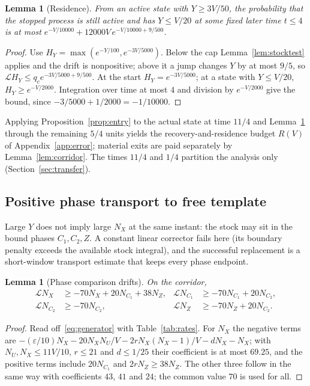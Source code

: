 \documentclass[11pt,a4paper]{article}
\theoremstyle{plain}
\newtheorem{lemma}[theorem]{Lemma}
\theoremstyle{definition}
\theoremstyle{remark}
\newcommand{\eps}{\varepsilon}
\newcommand{\Lgen}{\mathcal L}
\begin{document}
\begin{lemma}[Residence]\label{lem:residence}
From an active state with $Y\ge3V/50$, the probability that the stopped process is still active and has $Y\le V/20$ at some fixed later time $t\le4$ is at most $e^{-V/10000}+12000V\,e^{-V/10000+9/500}$.
\end{lemma}
\begin{proof}
Use $H_Y=\max(e^{-Y/100},e^{-3V/5000})$. Below the cap Lemma~\ref{lem:stocktest} applies and the drift is nonpositive; above it a jump changes $Y$ by at most $9/5$, so $\Lgen H_Y\le q_ce^{-3V/5000+9/500}$. At the start $H_Y=e^{-3V/5000}$; at a state with $Y\le V/20$, $H_Y\ge e^{-V/2000}$. Integration over time at most $4$ and division by $e^{-V/2000}$ give the bound, since $-3/5000+1/2000=-1/10000$.
\end{proof}
Applying Proposition~\ref{prop:entry} to the actual state at time $11/4$ and Lemma~\ref{lem:residence} through the remaining $5/4$ units yields the recovery-and-residence budget $R(V)$ of Appendix~\ref{app:error}; material exits are paid separately by Lemma~\ref{lem:corridor}. The times $11/4$ and $1/4$ partition the analysis only (Section~\ref{sec:transfer}).

\subsection{Positive phase transport to free template}\label{sec:phase}
Large $Y$ does not imply large $N_X$ at the same instant: the stock may sit in the bound phases $C_1,C_2,Z$. A constant linear corrector fails here (its boundary penalty exceeds the available stock integral), and the successful replacement is a short-window transport estimate that keeps every phase endpoint.

\begin{lemma}[Phase comparison drifts]\label{lem:phase}
On the corridor,
\begin{equation}\label{eq:phase-drift}
\begin{aligned}
\Lgen N_X&\ge-70N_X+20N_{C_1}+38N_Z,&
\Lgen N_{C_1}&\ge-70N_{C_1}+20N_{C_2},\\
\Lgen N_{C_2}&\ge-70N_{C_2},&
\Lgen N_Z&\ge-70N_Z+20N_{C_2}.
\end{aligned}
\end{equation}
\end{lemma}
\begin{proof}
Read off~\eqref{eq:generator} with Table~\ref{tab:rates}. For $N_X$ the negative terms are $-(\eps/10)N_X-20N_XN_U/V-2rN_X(N_X-1)/V-dN_X-N_X$; with $N_U,N_X\le11V/10$, $r\le21$ and $d\le1/25$ their coefficient is at most $69.25$, and the positive terms include $20N_{C_1}$ and $2rN_Z\ge38N_Z$. The other three follow in the same way with coefficients $43$, $41$ and $24$; the common value $70$ is used for all.
\end{proof}
\end{document}
